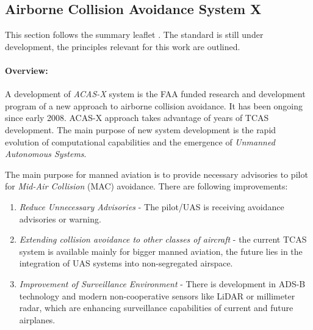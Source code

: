 \subsection{Airborne Collision Avoidance System X}\label{sec:ACASX}
\noindent This section follows the summary leaflet \cite{netalert2013n17}. The standard is still under development, the principles relevant for this work are outlined. 

\paragraph{Overview:} A development of \emph{ACAS-X} system is the FAA funded research and development program of a new approach to airborne collision avoidance. It has been ongoing since early 2008. ACAS-X approach takes advantage of years of TCAS development. The main purpose of new system development is the rapid evolution of computational capabilities and the emergence of \emph{Unmanned Autonomous  Systems}.

The main purpose for manned aviation is to provide necessary advisories to pilot for \emph{Mid-Air Collision} (MAC) avoidance. There are following improvements:

\begin{enumerate}
    \item \emph{Reduce Unnecessary Advisories} - The pilot/UAS is receiving avoidance advisories or warning. 
    
    \item \emph{Extending collision avoidance to other classes of aircraft} - the current TCAS system is available mainly for bigger manned aviation, the future lies in the  integration of UAS systems into non-segregated airspace.
    
    \item \emph{Improvement of Surveillance Environment} - There is development in ADS-B technology and modern non-cooperative sensors like LiDAR or millimeter radar, which are enhancing surveillance capabilities of current and future airplanes.
\end{enumerate}

